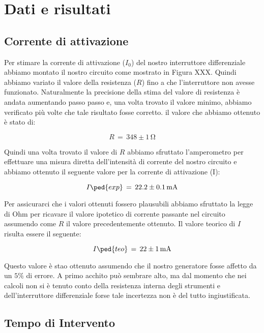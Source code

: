 \section*{Dati e risultati}

\subsection*{Corrente di attivazione}

Per stimare la corrente di attivazione ($I_0$) del nostro interruttore differenziale abbiamo montato il nostro circuito come mostrato in Figura XXX.
Quindi abbiamo variato il valore della resistenza ($R$) fino a che l'interruttore non avesse funzionato.
Naturalmente la precisione della stima del valore di resistenza è andata aumentando passo passo e, una volta trovato il valore minimo, abbiamo verificato più volte che tale risultato fosse corretto.
il valore che abbiamo ottenuto è stato di:

\begin{equation}
        R \,=\, 348 \pm 1 \,\si{\ohm}
\end{equation}

Quindi una volta trovato il valore di $R$ abbiamo sfruttato l'amperometro per effettuare una misura diretta dell'intensità di corrente del nostro circuito e abbiamo ottenuto il seguente valore per la corrente di attivazione (I):

\begin{equation}
        I\ped{exp} \,=\, 22.2 \pm 0.1 \,\si{\milli\ampere}
\end{equation}

Per assicurarci che i valori ottenuti fossero plausubili abbiamo sfruttato la legge di Ohm per ricavare il valore ipotetico di corrente passante nel circuito assumendo come $R$ il valore precedentemente ottenuto. Il valore teorico di $I$ risulta essere il seguente:

\begin{equation}
        I\ped{teo} \,=\, 22 \pm 1 \,\si{\milli\ampere}
\end{equation}

Questo valore è stao ottenuto assumendo che il nostro generatore fosse affetto da un $5\%$ di errore. A primo acchito può sembrare alto, ma dal momento che nei calcoli non si è tenuto conto della resistenza interna degli strumenti e dell'interruttore differenziale forse tale incertezza non è del tutto ingiustificata.

\subsection*{Tempo di Intervento}

